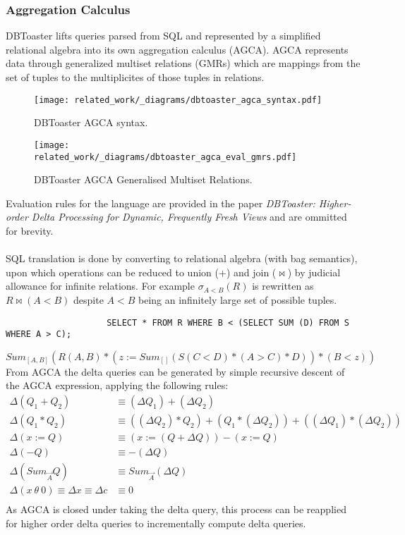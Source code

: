 \subsubsection{Aggregation Calculus}
DBToaster lifts queries parsed from SQL and represented by a simplified relational algebra into its own aggregation calculus (AGCA). AGCA represents data through generalized multiset relations (GMRs) which are mappings from the set of tuples to the multiplicites of those tuples in relations.
\begin{figure}[h!]
    \centering
    
    \texttt{[image: related\_work/\_diagrams/dbtoaster\_agca\_syntax.pdf]}
    \caption{DBToaster AGCA syntax.}
\end{figure}
\begin{figure}[h!]
    \centering
    \texttt{[image: related\_work/\_diagrams/dbtoaster\_agca\_eval\_gmrs.pdf]}
    \caption{DBToaster AGCA Generalised Multiset Relations.}
\end{figure}
Evaluation rules for the language are provided in the paper \textit{DBToaster: Higher-order Delta Processing for Dynamic, Frequently Fresh Views}\cite{DBToasterHigherOrderDeltaProcessing} and are ommitted for brevity.
\\
\\ SQL translation is done by converting to relational algebra (with bag semantics), upon which operations can be reduced to union ($+$) and join ($\bowtie$) by judicial allowance for infinite relations. For example $\sigma_{A<B}(R)$ is rewritten as $R \bowtie (A < B)$ despite $A < B$ being an infinitely large set of possible tuples.
\begin{verbatim}
                    SELECT * FROM R WHERE B < (SELECT SUM (D) FROM S WHERE A > C);
\end{verbatim}
\[Sum_{[A,B]}(R(A,B) \ast (z := Sum_{[]}(S(C<D) \ast (A > C) \ast D)) \ast (B < z))\]
From AGCA the delta queries can be generated by simple recursive descent of the AGCA expression, applying the following rules:
\[
    \begin{split}
        \Delta(Q_1 + Q_2) & \equiv (\Delta Q_1) + (\Delta Q_2) \\
        \Delta(Q_1 \ast Q_2) & \equiv ((\Delta Q_2) \ast Q_2) + (Q_1 \ast (\Delta Q_2)) + ((\Delta Q_1) \ast (\Delta Q_2)) \\
        \Delta (x := Q) & \equiv (x := (Q + \Delta Q)) - (x := Q) \\
        \Delta (-Q) & \equiv - (\Delta Q) \\
        \Delta(Sum_{\overrightarrow{A}}Q) & \equiv Sum_{\overrightarrow{A}}(\Delta Q) \\
        \Delta ( x \ \theta \ 0) \equiv \Delta x \equiv \Delta c & \equiv 0 \\
    \end{split}
\]
As AGCA is closed under taking the delta query, this process can be reapplied for higher order delta queries to incrementally compute delta queries.
